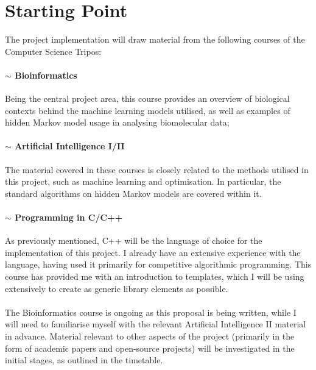 \section*{Starting Point}

The project implementation will draw material from the following courses of the Computer Science Tripos:

\paragraph{$\sim$ Bioinformatics} Being the central project area, this course provides an overview of biological contexts behind the machine learning models utilised, as well as examples of hidden Markov model usage in analysing biomolecular data;
\paragraph{$\sim$ Artificial Intelligence I/II} The material covered in these courses is closely related to the methods utilised in this project, such as machine learning and optimisation. In particular, the standard algorithms on hidden Markov models are covered within it.
\paragraph{$\sim$ Programming in C/C++} As previously mentioned, C++ will be the language of choice for the implementation of this project. I already have an extensive experience with the language, having used it primarily for competitive algorithmic programming. This course has provided me with an introduction to templates, which I will be using extensively to create as generic library elements as possible.\\ \\
The Bioinformatics course is ongoing as this proposal is being written, while I will need to familiarise myself with the relevant Artificial Intelligence II material in advance. Material relevant to other aspects of the project (primarily in the form of academic papers and open-source projects) will be investigated in the initial stages, as outlined in the timetable.

